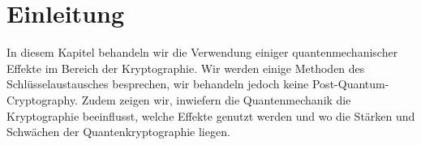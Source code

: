\section{Einleitung}
  In diesem Kapitel behandeln wir die Verwendung einiger quantenmechanischer Effekte im Bereich der Kryptographie.
  Wir werden einige Methoden des Schl\"usselaustausches besprechen, wir behandeln jedoch keine Post-Quantum-Cryptography.
  Zudem zeigen wir, inwiefern die Quantenmechanik die Kryptographie beeinflusst, welche Effekte genutzt werden und wo die St\"arken und Schw\"achen der Quantenkryptographie liegen.

